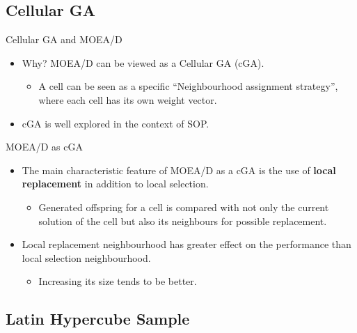 \documentclass[ignorenonframetext,]{beamer}
\providecommand{\tightlist}{%
  \setlength{\itemsep}{0pt}\setlength{\parskip}{0pt}}
\begin{document}
\subsection{Cellular GA}\label{cellular-ga}

\begin{frame}{Cellular GA and MOEA/D \citet{ishibuchi2009adaptation}}

\begin{itemize}
\tightlist
\item
  Why? MOEA/D can be viewed as a Cellular GA (cGA).

  \begin{itemize}
  \tightlist
  \item
    A cell can be seen as a specific ``Neighbourhood assignment
    strategy'', where each cell has its own weight vector.
  \end{itemize}
\item
  cGA is well explored in the context of SOP.
\end{itemize}

\end{frame}

\begin{frame}{MOEA/D as cGA}

\begin{itemize}
\tightlist
\item
  The main characteristic feature of MOEA/D as a cGA is the use of
  \textbf{local replacement} in addition to local selection.

  \begin{itemize}
  \tightlist
  \item
    Generated offspring for a cell is compared with not only the current
    solution of the cell but also its neighbours for possible
    replacement.
  \end{itemize}
\item
  Local replacement neighbourhood has greater effect on the performance
  than local selection neighbourhood.

  \begin{itemize}
  \tightlist
  \item
    Increasing its size tends to be better.
  \end{itemize}
\end{itemize}

\end{frame}

\subsection{Latin Hypercube Sample}\label{latin-hypercube-sample}
\end{document}
